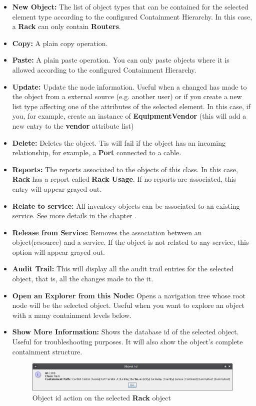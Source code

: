 \documentclass[a4paper]{article}
\begin{document}
	\begin{itemize}
		\item \textbf{New Object:} The list of object types that can be contained for the selected element type according to the configured Containment Hierarchy. In this case, a \textbf{Rack} can only contain \textbf{Routers}.
		\item \textbf{Copy:} A plain copy operation.
		\item \textbf{Paste:} A plain paste operation. You can only paste objects where it is allowed according to the configured Containment Hierarchy.
		\item \textbf{Update:} Update the node information. Useful when a changed has made to the object from a external source (e.g. another user) or if you create a new list type affecting one of the attributes of the selected element. In this case, if you, for example, create an instance of \textbf{EquipmentVendor} (this will add a new entry to the \textbf{vendor} attribute list)
		\item \textbf{Delete:} Deletes the object. Tis will fail if the object has an incoming relationship, for example, a \textbf{Port} connected to a cable.
		\item \textbf{Reports:} The reports associated to the objects of this class. In this case, \textbf{Rack} has a report called \textbf{Rack Usage}. If no reports are associated, this entry will appear grayed out.
		\item \textbf{Relate to service:} All inventory objects can be associated to an existing service. See more details in the chapter .
		\item \textbf{Release from Service:} Removes the association between an object(resource) and a service. If the object is not related to any service, this option will appear grayed out.
		\item \textbf{Audit Trail:} This will display all the audit trail entries for the selected object, that is, all the changes made to the it.
		\item \textbf{Open an Explorer from this Node:} Opens a navigation tree whose root node will be the selected object. Useful when you want to explore an object with a many containment levels below.
		\item \textbf{Show More Information:} Shows the database id of the selected object. Useful for troubleshooting purposes. It will also show the object's complete containment structure.
			\begin{figure}[h!]
				\centering
				\includegraphics[width=\linewidth]{img/action_show_object_id.png}
				\caption{Object id action on the selected \textbf{Rack} object}
				\label{fig:action_show_object_id}
			\end{figure}
	\end{itemize}
\end{document}
